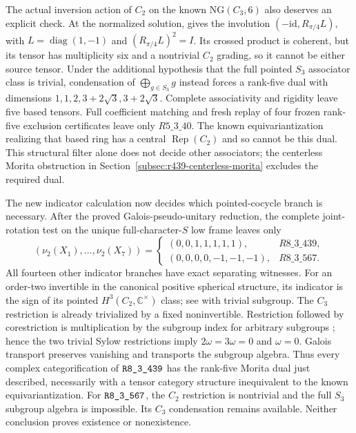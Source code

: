 The actual inversion action of $C_2$ on the known
$\mathrm{NG}(C_3,6)$ also deserves an explicit check. At the normalized
solution, \cite[Lemma~13.1 and Example~13.10]{IzumiNear} gives the
involution $(-\mathrm{id},R_{\pi/4}L)$, with $L=\operatorname{diag}(1,-1)$
and $(R_{\pi/4}L)^2=I$. Its crossed product is coherent, but its tensor
has multiplicity six and a nontrivial $C_2$ grading, so it cannot be
either source tensor. Under the additional hypothesis that the full
pointed $S_3$ associator class is trivial, condensation of
$\bigoplus_{g\in S_3}g$ instead forces a rank-five dual with dimensions
$1,1,2,3+2\sqrt3,3+2\sqrt3$. Complete associativity and rigidity leave
five based tensors. Full coefficient matching and fresh replay of four
frozen rank-five exclusion certificates leave only $R5\_3\_40$.
The known equivariantization realizing that based ring has a central
$\operatorname{Rep}(C_2)$ and so cannot be this dual. This structural filter alone does not decide other associators; the centerless Morita obstruction in Section~\ref{subsec:r439-centerless-morita} excludes the required dual.

The new indicator calculation now decides which pointed-cocycle branch
is necessary. After the proved Galois-pseudo-unitary reduction, the
complete joint-rotation test on the unique full-character-$S$ low frame
leaves only
\[
 (\nu_2(X_1),\ldots,\nu_2(X_7))=
 \begin{cases}
 (0,0,1,1,1,1,1),&R8\_3\_439,\\
 (0,0,0,0,-1,-1,-1),&R8\_3\_567.
 \end{cases}
\]
All fourteen other indicator branches have exact separating witnesses.
For an order-two invertible in the canonical positive spherical
structure, its indicator is the sign of its pointed $H^3(C_2,\mathbb
C^\times)$ class; see \cite[Definition~2.2 and Proposition~4.1]{SchauenburgPointedFrontier}
with trivial subgroup. The $C_3$ restriction is already trivialized by
a fixed noninvertible. Restriction followed by corestriction is
multiplication by the subgroup index for arbitrary subgroups
\cite[Section~3.3, equation~(3.12)]{BrownTransferFrontier}; hence the
two trivial Sylow restrictions imply $2\omega=3\omega=0$ and
$\omega=0$. Galois transport preserves vanishing and transports the
subgroup algebra. Thus every complex categorification of $\sha{R8_3_439}$
has the rank-five Morita dual just described, necessarily with a tensor
category structure inequivalent to the known equivariantization.
For $\sha{R8_3_567}$, the $C_2$ restriction is nontrivial and the full
$S_3$ subgroup algebra is impossible. Its $C_3$ condensation remains
available. Neither conclusion proves existence or nonexistence.

